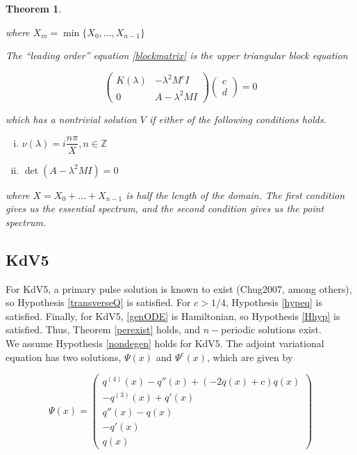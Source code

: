 \documentclass[12pt]{article}
\def\Z{{\mathbb Z}}
\newtheorem{theorem}{Theorem}
\begin{document}
\begin{theorem}
\begin{enumerate}
where $X_m = \min \{X_0, \dots, X_{n-1}\}$

\end{enumerate}

The ``leading order'' equation \eqref{blockmatrix} is the upper triangular block equation

\begin{equation}\label{blocktri}
\begin{pmatrix}
K(\lambda) & -\lambda^2 M^c I  \\
0 & A - \lambda^2 MI 
\end{pmatrix}
\begin{pmatrix}c \\ d \end{pmatrix} = 0
\end{equation}

which has a nontrivial solution $V$ if either of the following conditions holds.

\begin{enumerate}[(i)]
\item $\nu(\lambda) = i \dfrac{n \pi}{X}, n \in \Z$ 
\item $\det(A - \lambda^2 MI) = 0$
\end{enumerate}

where $X = X_0 + \dots + X_{n-1}$ is half the length of the domain. The first condition gives us the essential spectrum, and the second condition gives us the point spectrum.

\end{theorem}

\subsection{KdV5}

For KdV5, a primary pulse solution is known to exist (Chug2007, among others), so Hypothesis \ref{transverseQ} is satisfied. For $c > 1/4$, Hypothesis \ref{hypeq} is satisfied. Finally, for KdV5, \eqref{genODE} is Hamiltonian, so Hypothesis \ref{Hhyp} is satisfied. Thus, Theorem \ref{perexist} holds, and $n-$periodic solutions exist.\\

We assume Hypothesis \ref{nondegen} holds for KdV5. The adjoint variational equation has two solutions, $\Psi(x)$ and $\Psi^c(x)$, which are given by

\begin{equation}\label{KdV5psi}
\Psi(x) = \begin{pmatrix}
q^{(4)}(x) - q''(x) + (-2q(x) + c)q(x)\\
-q^{(3)}(x) + q'(x) \\
q''(x) - q(x) \\
-q'(x) \\
q(x)
\end{pmatrix}
\end{equation}
\end{document}
